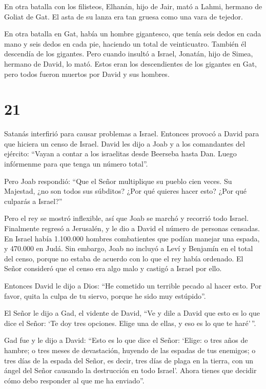  En otra batalla con los filisteos, Elhanán, hijo de Jair,
mató a Lahmi, hermano de Goliat de Gat. El asta de su lanza era tan
gruesa como una vara de tejedor.

 En otra batalla en Gat, había un hombre gigantesco, que
tenía seis dedos en cada mano y seis dedos en cada pie, haciendo un
total de veinticuatro. También él descendía de los gigantes.
 Pero cuando insultó a Israel, Jonatán, hijo de Simea,
hermano de David, lo mató.  Estos eran los descendientes de
los gigantes en Gat, pero todos fueron muertos por David y sus hombres.

\hypertarget{section-20}{%
\section{21}\label{section-20}}

 Satanás interfirió para causar problemas a Israel. Entonces
provocó a David para que hiciera un censo de Israel.  David
les dijo a Joab y a los comandantes del ejército: ``Vayan a contar a los
israelitas desde Beerseba hasta Dan. Luego infórmenme para que tenga un
número total''.

 Pero Joab respondió: ``Que el Señor multiplique su pueblo
cien veces. Su Majestad, ¿no son todos sus súbditos? ¿Por qué quieres
hacer esto? ¿Por qué culparás a Israel?''

 Pero el rey se mostró inflexible, así que Joab se marchó y
recorrió todo Israel. Finalmente regresó a Jerusalén,  y le
dio a David el número de personas censadas. En Israel había 1.100.000
hombres combatientes que podían manejar una espada, y 470.000 en Judá.
 Sin embargo, Joab no incluyó a Leví y Benjamín en el total
del censo, porque no estaba de acuerdo con lo que el rey había ordenado.
 El Señor consideró que el censo era algo malo y castigó a
Israel por ello.

 Entonces David le dijo a Dios: ``He cometido un terrible
pecado al hacer esto. Por favor, quita la culpa de tu siervo, porque he
sido muy estúpido''.

 El Señor le dijo a Gad, el vidente de David, 
``Ve y dile a David que esto es lo que dice el Señor: `Te doy tres
opciones. Elige una de ellas, y eso es lo que te haré'\,''.

 Gad fue y le dijo a David: ``Esto es lo que dice el Señor:
`Elige:  o tres años de hambre; o tres meses de
devastación, huyendo de las espadas de tus enemigos; o tres días de la
espada del Señor, es decir, tres días de plaga en la tierra, con un
ángel del Señor causando la destrucción en todo Israel'. Ahora tienes
que decidir cómo debo responder al que me ha enviado''.

